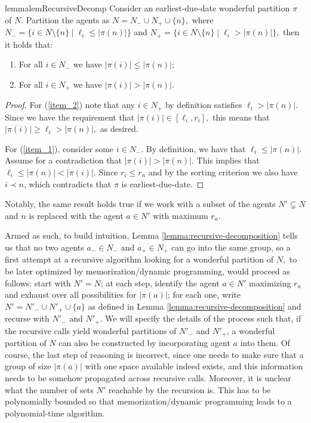 \documentclass[a4paper,UKenglish,cleveref, autoref, thm-restate]{lipics-v2021}
\newcommand{\set}[1]{\{#1\}}
\newcommand{\modulus}[1]{\vert #1 \vert}
\begin{document}
\begin{restatable}{lemma}{lemRecursiveDecomp} \label{lemma:recursive-decomposition} Consider an earliest-due-date wonderful partition $\pi$ of $N.$ Partition the agents as $N = N_{-} \cup N_{+} \cup \{n\},$ where $N_{-} = \set{i \in N \setminus \{n\} \mid \ell_i \leq \modulus{\pi(n)}}$ and $N_{+} = \set{i \in N \setminus \{n\} \mid \ell_i > \modulus{\pi(n)}},$ then it holds that:

\begin{enumerate}
    \item  \label{item_1} For all $i \in N_{-}$ we have $\modulus{\pi(i)} \leq \modulus{\pi(n)}$;
    \item \label{item_2} For all $i \in N_{+}$ we have $\modulus{\pi(i)} > \modulus{\pi(n)}.$
\end{enumerate}%
\end{restatable}
\begin{proof} For (\ref{item_2}) note that any $i \in N_{+}$ by definition satisfies $\ell_i > \modulus{\pi(n)}.$ Since we have the requirement that $\modulus{\pi(i)} \in [\ell_i, r_i],$ this means that $\modulus{\pi(i)} \geq \ell_i > \modulus{\pi(n)},$ as desired.

For (\ref{item_1}), consider some $i \in N_{-}.$ By definition, we have that $\ell_i \leq \modulus{\pi(n)}.$ Assume for a contradiction that $\modulus{\pi(i)} > \modulus{\pi(n)}.$ This implies that $\ell_i \leq \modulus{\pi(n)} < \modulus{\pi(i)}.$ Since $r_i \leq r_n$ and by the sorting criterion we also have $i \prec n$, which contradicts that $\pi$ is earliest-due-date.
\end{proof}

\noindent Notably, the same result holds true if we work with a subset of the agents $N' \subsetneq N$ and $n$ is replaced with the agent $a \in N'$ with maximum $r_a.$

Armed as such, to build intuition, Lemma \ref{lemma:recursive-decomposition} tells us that no two agents $a_{-} \in N_{-}$ and $a_{+} \in N_{+}$ can go into the same group, so a first attempt at a recursive algorithm looking for a wonderful partition of $N,$  to be later optimized by memorization/dynamic programming, would proceed as follows: start with $N' = N$; at each step, identify the agent $a \in N'$ maximizing $r_a$ and exhaust over all possibilities for $\modulus{\pi(a)}$; for each one, write $N' = N'_{-} \cup N'_{+} \cup \{a\}$ as defined in Lemma \ref{lemma:recursive-decomposition} and recurse with $N'_{-}$ and $N'_{+}$. We will specify the details of the process such that, if the recursive calls yield wonderful partitions of $N'_{-}$ and $N'_{+}$, a wonderful partition of $N$ can also be constructed by incorporating agent $a$ into them.
Of course, the last step of reasoning is incorrect, since one needs to make sure that a group of size $\modulus{\pi(a)}$ with one space available indeed exists, and this information needs to be somehow propagated across recursive calls. Moreover, it is unclear what the number of sets $N'$ reachable by the recursion is. This has to be polynomially bounded so that memorization/dynamic programming leads to a polynomial-time algorithm.
\end{document}
